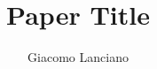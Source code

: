 \documentclass[a4paper,10pt,twocolumn]{article}
\title{
    Paper Title
}
\author{Giacomo Lanciano}
\begin{document}
\maketitle

\begin{abstract}
    
\end{abstract}










\end{document}

